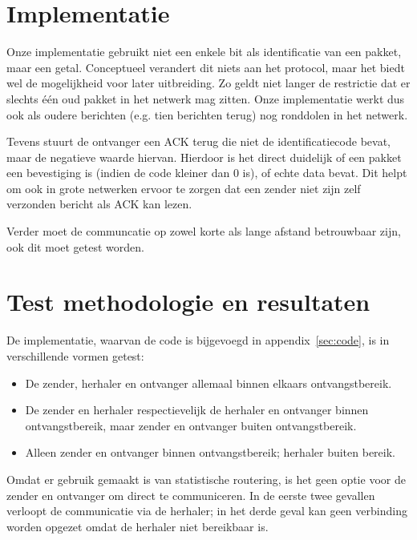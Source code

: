 \documentclass[a4paper,10pt]{article}
\begin{document}
\section{Implementatie}
Onze implementatie gebruikt niet een enkele bit als identificatie van een pakket, maar een getal. Conceptueel verandert dit niets aan het protocol, maar het biedt wel de mogelijkheid voor later uitbreiding. Zo geldt niet langer de restrictie dat er slechts \'e\'en oud pakket in het netwerk mag zitten. Onze implementatie werkt dus ook als oudere berichten (e.g. tien berichten terug) nog ronddolen in het netwerk.

Tevens stuurt de ontvanger een ACK terug die niet de identificatiecode bevat, maar de negatieve waarde hiervan. Hierdoor is het direct duidelijk of een pakket een bevestiging is (indien de code kleiner dan 0 is), of echte data bevat. Dit helpt om ook in grote netwerken ervoor te zorgen dat een zender niet zijn zelf verzonden bericht als ACK kan lezen.

Verder moet de communcatie op zowel korte als lange afstand betrouwbaar zijn, ook dit moet getest worden.

\section{Test methodologie en resultaten}
De implementatie, waarvan de code is bijgevoegd in appendix~\ref{sec:code}, is in verschillende vormen getest:
\begin{itemize}
	\item De zender, herhaler en ontvanger allemaal binnen elkaars ontvangstbereik.
	\item De zender en herhaler respectievelijk de herhaler en ontvanger binnen ontvangstbereik, maar zender en ontvanger buiten ontvangstbereik.
	\item Alleen zender en ontvanger binnen ontvangstbereik; herhaler buiten bereik.
\end{itemize}
Omdat er gebruik gemaakt is van statistische routering, is het geen optie voor de zender en ontvanger om direct te communiceren. In de eerste twee gevallen verloopt de communicatie via de herhaler; in het derde geval kan geen verbinding worden opgezet omdat de herhaler niet bereikbaar is.
\end{document}
